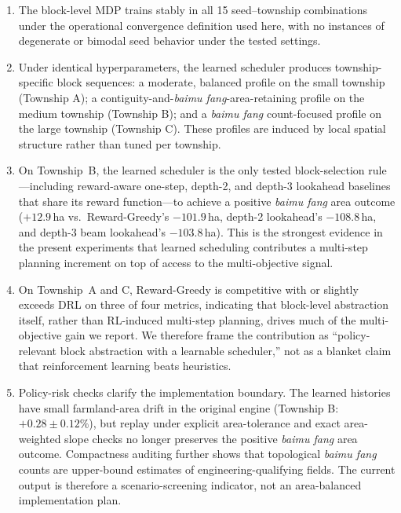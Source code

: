 \documentclass[preprint,12pt]{elsarticle}
\begin{document}
\begin{enumerate}
\item The block-level MDP trains stably in all 15 seed--township combinations under the operational convergence definition used here, with no instances of degenerate or bimodal seed behavior under the tested settings.

\item Under identical hyperparameters, the learned scheduler produces township-specific block sequences: a moderate, balanced profile on the small township (Township A); a contiguity-and-\textit{baimu fang}-area-retaining profile on the medium township (Township B); and a \textit{baimu fang} count-focused profile on the large township (Township C). These profiles are induced by local spatial structure rather than tuned per township.

\item On Township~B, the learned scheduler is the only tested block-selection rule---including reward-aware one-step, depth-2, and depth-3 lookahead baselines that share its reward function---to achieve a positive \textit{baimu fang} area outcome ($+12.9$\,ha vs.\ Reward-Greedy's $-101.9$\,ha, depth-2 lookahead's $-108.8$\,ha, and depth-3 beam lookahead's $-103.8$\,ha). This is the strongest evidence in the present experiments that learned scheduling contributes a multi-step planning increment on top of access to the multi-objective signal.

\item On Township~A and C, Reward-Greedy is competitive with or slightly exceeds DRL on three of four metrics, indicating that block-level abstraction itself, rather than RL-induced multi-step planning, drives much of the multi-objective gain we report. We therefore frame the contribution as ``policy-relevant block abstraction with a learnable scheduler,'' not as a blanket claim that reinforcement learning beats heuristics.

\item Policy-risk checks clarify the implementation boundary. The learned histories have small farmland-area drift in the original engine (Township B: $+0.28\pm0.12\%$), but replay under explicit area-tolerance and exact area-weighted slope checks no longer preserves the positive \textit{baimu fang} area outcome. Compactness auditing further shows that topological \textit{baimu fang} counts are upper-bound estimates of engineering-qualifying fields. The current output is therefore a scenario-screening indicator, not an area-balanced implementation plan.
\end{enumerate}
\end{document}
